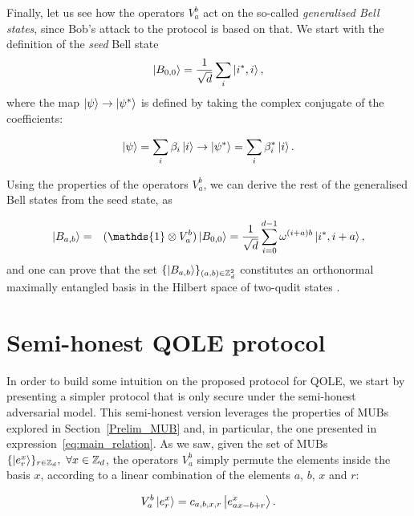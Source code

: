 Finally, let us see how the operators $V^b_a$ act on the so-called \textit{generalised Bell states}, since Bob's attack to the protocol is based on that. We start with the definition of the \textit{seed} Bell state 
\begin{equation*}
    \ket{B_{0,0}} = \frac{1}{\sqrt{d}}\sum_{i} \ket{i^*, i},\label{eq:Bellseed}
\end{equation*}
where the map $\ket{\psi}\rightarrow\ket{\psi^*}$ is defined by taking the complex conjugate of the coefficients:

$$\ket{\psi} = \sum_i \beta_i \ket{i}\rightarrow \ket{\psi^*} = \sum_i \beta_i^* \ket{i}.$$

Using the properties of the operators $V_a^b$, we can derive the rest of the generalised Bell states from the seed state, as

\begin{eqnarray}
\ket{B_{a,b}} &=& (\mathds{1} \otimes V^b_a) \ket{B_{0,0}} = \frac{1}{\sqrt{d}} \sum_{i=0}^{d-1} \omega^{(i+a)b} \ket{i^*, i+a}, \label{eq:bob_attack}
\end{eqnarray}
and one can prove that the set $\{\ket{B_{a, b}}\}_{(a,b) \in\mathbb{Z}_d^2}$ constitutes an orthonormal maximally entangled basis in the Hilbert space of two-qudit states \cite{DEBZ10}.



\section{Semi-honest QOLE protocol}\label{insecureQOLE}

 In order to build some intuition on the proposed protocol for QOLE, we start by presenting a simpler protocol that is only secure under the semi-honest adversarial model. This semi-honest version leverages the properties of MUBs explored in Section~\ref{Prelim_MUB} and, in particular, the one presented in expression~\eqref{eq:main_relation}. As we saw, given the set of MUBs $\{ \ket{e^x_r} \}_{r\in\mathbb{Z}_d},\ \forall x\in\mathbb{Z}_d$, the operators $V^b_a$ simply permute the elements inside the basis $x$, according to a linear combination of the elements $a$, $b$, $x$ and $r$:

\begin{equation}
V^b_a \ket{e^x_r} = c_{a, b, x, r} \ket{e^x_{ax - b +r}}.
\label{eq:main_ingredient}
\end{equation}

